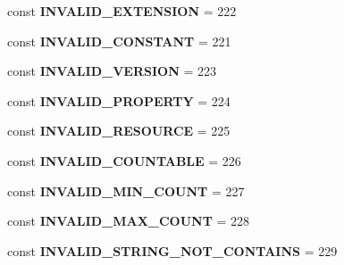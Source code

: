 \begin{DoxyCompactItemize}
\mbox{\label{class_assert_1_1_assertion_abb55a6e5a5700704b2cc8717f50319d4}} 
const {\bfseries I\+N\+V\+A\+L\+I\+D\+\_\+\+E\+X\+T\+E\+N\+S\+I\+ON} = 222
\item 
\mbox{\label{class_assert_1_1_assertion_a9840289ce0a7f6d2643d5adfae09e15d}} 
const {\bfseries I\+N\+V\+A\+L\+I\+D\+\_\+\+C\+O\+N\+S\+T\+A\+NT} = 221
\item 
\mbox{\label{class_assert_1_1_assertion_a456c7a8504f1b1a67a6646d2b668d3c9}} 
const {\bfseries I\+N\+V\+A\+L\+I\+D\+\_\+\+V\+E\+R\+S\+I\+ON} = 223
\item 
\mbox{\label{class_assert_1_1_assertion_ab3ce7edfaef10d60600373e209448637}} 
const {\bfseries I\+N\+V\+A\+L\+I\+D\+\_\+\+P\+R\+O\+P\+E\+R\+TY} = 224
\item 
\mbox{\label{class_assert_1_1_assertion_a271fe12f253d2361313a86102ff43fa1}} 
const {\bfseries I\+N\+V\+A\+L\+I\+D\+\_\+\+R\+E\+S\+O\+U\+R\+CE} = 225
\item 
\mbox{\label{class_assert_1_1_assertion_ac849d9ed4c7b63225cc126196953ab60}} 
const {\bfseries I\+N\+V\+A\+L\+I\+D\+\_\+\+C\+O\+U\+N\+T\+A\+B\+LE} = 226
\item 
\mbox{\label{class_assert_1_1_assertion_a46c4e7eb0c20fd901cc5768d2636131c}} 
const {\bfseries I\+N\+V\+A\+L\+I\+D\+\_\+\+M\+I\+N\+\_\+\+C\+O\+U\+NT} = 227
\item 
\mbox{\label{class_assert_1_1_assertion_a3b58ae7fed2ce6499e440e9a25bc6232}} 
const {\bfseries I\+N\+V\+A\+L\+I\+D\+\_\+\+M\+A\+X\+\_\+\+C\+O\+U\+NT} = 228
\item 
\mbox{\label{class_assert_1_1_assertion_a9a04e79788f54a56b8bd74e1b58bf49a}} 
const {\bfseries I\+N\+V\+A\+L\+I\+D\+\_\+\+S\+T\+R\+I\+N\+G\+\_\+\+N\+O\+T\+\_\+\+C\+O\+N\+T\+A\+I\+NS} = 229
\end{DoxyCompactItemize}
